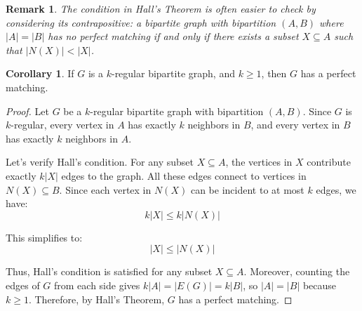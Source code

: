 \documentclass{article}
\newtheorem{remark}{Remark}
\theoremstyle{definition}
\newtheorem{corollary}{Corollary}
\begin{document}
\begin{remark}
The condition in Hall's Theorem is often easier to check by considering its contrapositive: a bipartite graph with bipartition $(A,B)$ where $|A| = |B|$ has no perfect matching if and only if there exists a subset $X \subseteq A$ such that $|N(X)| < |X|$.
\end{remark}

\begin{corollary}
If $G$ is a $k$-regular bipartite graph, and $k \geq 1$, then $G$ has a perfect matching.
\end{corollary}

\begin{proof}
Let $G$ be a $k$-regular bipartite graph with bipartition $(A,B)$. Since $G$ is $k$-regular, every vertex in $A$ has exactly $k$ neighbors in $B$, and every vertex in $B$ has exactly $k$ neighbors in $A$. 

Let's verify Hall's condition. For any subset $X \subseteq A$, the vertices in $X$ contribute exactly $k|X|$ edges to the graph. All these edges connect to vertices in $N(X) \subseteq B$. Since each vertex in $N(X)$ can be incident to at most $k$ edges, we have:
\[k|X| \leq k|N(X)|\]

This simplifies to:
\[|X| \leq |N(X)|\]

Thus, Hall's condition is satisfied for any subset $X \subseteq A$. Moreover, counting the edges of $G$ from each side gives $k|A| = |E(G)| = k|B|$, so $|A| = |B|$ because $k \geq 1$. Therefore, by Hall's Theorem, $G$ has a perfect matching.
\end{proof}
\end{document}
